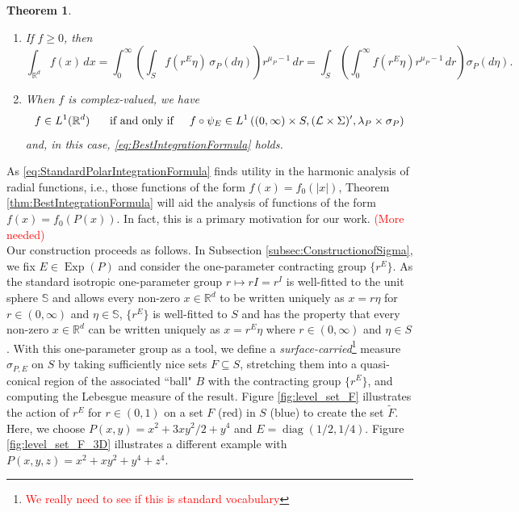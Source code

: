 \documentclass[11pt]{article}
\newtheorem{theorem}{Theorem}[section]
\theoremstyle{remark}
\newcommand\Exp{\operatorname{Exp}}
\newcommand\diag{\operatorname{diag}}
\begin{document}
\begin{theorem}
\begin{enumerate}
\begin{enumerate}
\item If $f\geq 0$, then
\begin{equation}\label{eq:BestIntegrationFormula}
\int_{\mathbb{R}^d}f(x)\,dx=\int_0^\infty\left(\int_S f(r^E\eta)\,\sigma_P(d\eta)\right)r^{\mu_P-1}\,dr=\int_S\left(\int_0^\infty f(r^E\eta)r^{\mu_P-1}\,dr\right)\sigma_P(d\eta).
\end{equation}
\item When $f$ is complex-valued, we have 
\begin{equation*}f\in L^1(\mathbb{R}^d)\hspace{.5cm}\mbox{ if and only if}\hspace{.5cm}f\circ\psi_E\in L^1\left((0,\infty)\times S,(\mathcal{L}\times\Sigma)',\lambda_P\times\sigma_P\right)
\end{equation*} 
and, in this case, \eqref{eq:BestIntegrationFormula} holds.
\end{enumerate}
\end{enumerate}
\end{theorem}
\noindent As \eqref{eq:StandardPolarIntegrationFormula} finds utility in the harmonic analysis of radial functions, i.e., those functions of the form $f(x)=f_0(|x|)$, Theorem \ref{thm:BestIntegrationFormula} will aid the analysis of functions of the form $f(x)=f_0(P(x))$. In fact, this is a primary motivation for our work. \textcolor{red}{(More needed)}\\

\noindent Our construction proceeds as follows. In Subsection \ref{subsec:ConstructionofSigma}, we fix $E\in\Exp(P)$ and consider the one-parameter contracting group $\{r^E\}$. As the standard isotropic one-parameter group $r\mapsto rI=r^I$ is well-fitted to the unit sphere $\mathbb{S}$ and allows every non-zero $x\in\mathbb{R}^d$ to be written uniquely as $x=r\eta$ for $r\in (0,\infty)$ and $\eta\in \mathbb{S}$, $\{r^E\}$ is well-fitted to $S$ and has the property that every non-zero $x\in\mathbb{R}^d$ can be written uniquely as $x=r^E\eta$ where $r\in(0,\infty)$ and $\eta\in S$. With this one-parameter group as a tool, we define a \textit{surface-carried}\footnote{\textcolor{red}{We really need to see if this is standard vocabulary}} measure $\sigma_{P,E}$ on $S$ by taking sufficiently nice sets $F\subseteq S$, stretching them into a quasi-conical region of the associated ``ball" $B$ with the contracting group $\{r^E\}$, and computing the Lebesgue measure of the result. Figure \ref{fig:level_set_F} illustrates the action of $r^E$ for $r\in (0,1)$ on a set $F$ (red) in $S$ (blue) to create the set $\widetilde{F}$. Here, we choose $P(x,y) = x^2 + 3xy^2/2 + y^4$ and $E= \diag(1/2, 1/4)$. Figure \ref{fig:level_set_F_3D} illustrates a different example with $P(x,y,z) = x^2 + xy^2 + y^4 + z^4$.
\end{document}
